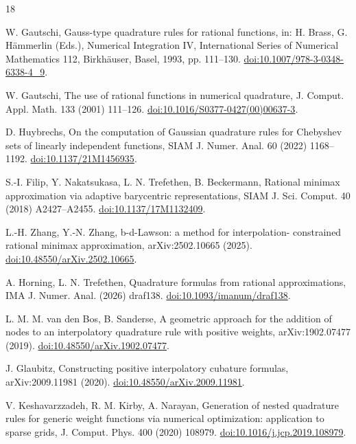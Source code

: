 \documentclass[preprint,12pt]{elsarticle}
\theoremstyle{remark}
\begin{document}
\begin{thebibliography}{18}
\providecommand{\url}[1]{\texttt{#1}}

W. Gautschi, Gauss-type quadrature rules for rational functions,
in: H. Brass, G. H\"ammerlin (Eds.), Numerical Integration IV,
International Series of Numerical Mathematics 112, Birkh\"auser,
Basel, 1993, pp. 111--130.
\href{https://doi.org/10.1007/978-3-0348-6338-4_9}{doi:10.1007/978-3-0348-6338-4\_9}.

W. Gautschi, The use of rational functions in numerical quadrature,
J. Comput. Appl. Math. 133 (2001) 111--126.
\href{https://doi.org/10.1016/S0377-0427(00)00637-3}{doi:10.1016/S0377-0427(00)00637-3}.

D. Huybrechs, On the computation of Gaussian quadrature rules for
Chebyshev sets of linearly independent functions,
SIAM J. Numer. Anal. 60 (2022) 1168--1192.
\href{https://doi.org/10.1137/21M1456935}{doi:10.1137/21M1456935}.

S.-I. Filip, Y. Nakatsukasa, L. N. Trefethen, B. Beckermann,
Rational minimax approximation via adaptive barycentric
representations, SIAM J. Sci. Comput. 40 (2018) A2427--A2455.
\href{https://doi.org/10.1137/17M1132409}{doi:10.1137/17M1132409}.

L.-H. Zhang, Y.-N. Zhang, b-d-Lawson: a method for interpolation-
constrained rational minimax approximation, arXiv:2502.10665 (2025).
\href{https://doi.org/10.48550/arXiv.2502.10665}{doi:10.48550/arXiv.2502.10665}.

A. Horning, L. N. Trefethen, Quadrature formulas from rational
approximations, IMA J. Numer. Anal. (2026) draf138.
\href{https://doi.org/10.1093/imanum/draf138}{doi:10.1093/imanum/draf138}.

L. M. M. van den Bos, B. Sanderse, A geometric approach for the
addition of nodes to an interpolatory quadrature rule with positive
weights, arXiv:1902.07477 (2019).
\href{https://doi.org/10.48550/arXiv.1902.07477}{doi:10.48550/arXiv.1902.07477}.

J. Glaubitz, Constructing positive interpolatory cubature formulas,
arXiv:2009.11981 (2020).
\href{https://doi.org/10.48550/arXiv.2009.11981}{doi:10.48550/arXiv.2009.11981}.

V. Keshavarzzadeh, R. M. Kirby, A. Narayan, Generation of nested
quadrature rules for generic weight functions via numerical
optimization: application to sparse grids, J. Comput. Phys. 400 (2020)
108979.
\href{https://doi.org/10.1016/j.jcp.2019.108979}{doi:10.1016/j.jcp.2019.108979}.


\end{thebibliography}
\end{document}
